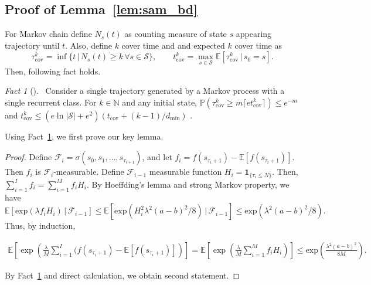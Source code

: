 \documentclass{article}
\newtheorem{lemma}[theorem]{Lemma}
\theoremstyle{definition}
\theoremstyle{remark}
\newtheorem{fact}{Fact}
\newcommand{\expec}{\mathbb{E}}
\newcommand{\real}{\mathbb{R}}
\newcommand{\cS}{\mathcal{S}}
\newcommand{\cF}{\mathcal{F}}
\newcommand{\prob}{\mathbb{P}}
\begin{document}
\subsection{Proof of Lemma~\ref{lem:sam_bd}}
For Markov chain define $N_s (t)$ as counting measure of state $s$ appearing trajectory until $t$. Also, define $k$ cover time and and expected $k$ cover time as  
\[\tau^k_{\mathrm{cov}} = \inf \{ t \,|\,  N_s(t) \ge k \,\forall s\in \cS\}, \qquad t^{k}_{\mathrm{cov}}=\max_{s \in \cS} \expec [\tau^k_{\mathrm{cov}} \,|\, s_0=s].\]
Then, following fact holds.
\begin{fact}[\cite{chan2021learning}]~\label{fact:kcov}
 Consider a single trajectory generated by a Markov process with a single recurrent class. For $k\in \mathbb{N}$ and  any initial state, $\prob (\tau^k_{\mathrm{cov}} \ge m \lceil et^k_{\mathrm{cov}} \rceil)\le e^{-m}$ and $t^k_{\mathrm{cov}} \le  (e \ln|\cS|+e^2)( t_{\mathrm{cov}}+(k-1)/d_{\mathrm{min}})$ . 
\end{fact}
Using Fact~\ref{fact:kcov}, we first prove our key lemma.

\begin{proof}
Define $\cF_{i} = \sigma(s_0, s_1, \dots, s_{\tau_{i+1}})$, and let $f_i=  f( s_{\tau_{i}+1})- \expec \left[ f(s_{\tau_i+1})\right]$. Then $f_i$ is $\cF_{i}$-measurable. Define $\cF_{i-1}$ measurable function $H_i = \mathbf{1}_{\{\tau_i \le N\}}$. Then, $\sum^I_{i=1}f_i=\sum^M_{i=1}f_i H_i$. By Hoeffding's lemma and strong Markov property, we have
\[\expec[\mathrm{exp}(\lambda f_i H_i) \,|\, \cF_{i-1}] \le \expec[\mathrm{exp}( H^2_i \lambda^2 (a-b)^2/8)\,|\, \cF_{i-1}] \le \mathrm{exp}( \lambda^2 (a-b)^2/8).\]
Thus, by induction,

\begin{align*}
    \expec\left[\exp \left(\frac{\lambda}{M}\sum^I_{i=1}(f(s_{\tau_{i}+1}) -\expec [f(s_{\tau_{i}+1})]\right)\right]  =\expec\left[\exp \left(\frac{\lambda}{M}\sum^M_{i=1}f_iH_i\right)\right]
\le \mathrm{exp}\left( \frac{ \lambda^2(a-b)^2}{8M}\right).
\end{align*}

By Fact~\ref{fact:kcov} and direct calculation, we obtain second statement.
\end{proof}
\end{document}
